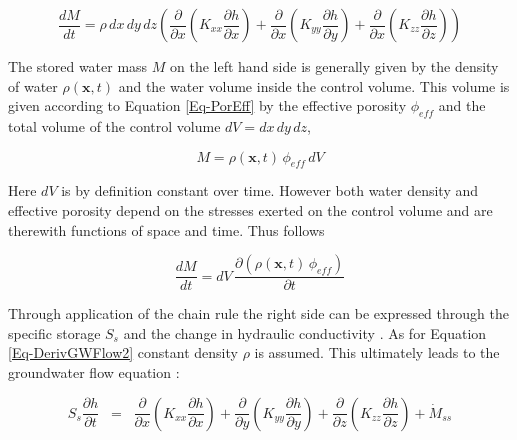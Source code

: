 \begin{equation}
    \label{Eq-DerivGWFlow4}
    \frac{dM}{dt} = \rho \, dx \, dy \, dz \left( \frac{\partial}{\partial x} \left( K_{xx} \frac{\partial h}{\partial x} \right) + \frac{\partial}{\partial x} \left( K_{yy} \frac{\partial h}{\partial y} \right) + \frac{\partial}{\partial x} \left( K_{zz} \frac{\partial h}{\partial z} \right) \right)
\end{equation}

The stored water mass $M$ on the left hand side is generally given by the density of water $\rho(\bm{x},t)$ and the water volume inside the control volume. 
This volume is given according to Equation \eqref{Eq-PorEff} by the effective porosity $\phi_{eff}$ and the total volume of the control volume $dV = dx \, dy \, dz$,

\begin{equation}
    \label{Eq-DerivGWFlow5}
    M = \rho(\bm{x},t) \, \phi_{eff} \, dV
\end{equation}

\noindent Here $dV$ is by definition constant over time. However both water density and effective porosity depend on the stresses exerted on the control volume and are therewith functions of space and time. 
Thus follows

\begin{equation}
    \label{Eq-DerivGWFlow6}
    \frac{dM}{dt} = dV \, \frac{\partial (\rho(\bm{x},t) \, \phi_{eff})}{\partial t}
\end{equation}

\noindent Through application of the chain rule the right side can be expressed through the specific storage $S_s$ and the change in hydraulic conductivity \parencite{Mays.2005}. 
As for Equation \eqref{Eq-DerivGWFlow2} constant density $\rho$ is assumed. This ultimately leads to the groundwater flow equation \parencite{Mays.2005}:

\begin{equation}
    \label{Eq-GWFlow}
    S_s \frac{\partial h}{\partial t} \; \; = \; \; \frac{\partial}{\partial x} \left(K_{xx} \frac{\partial h}{\partial x} \right) + \frac{\partial}{\partial y} \left(K_{yy} \frac{\partial h}{\partial y} \right) + \frac{\partial}{\partial z} \left(K_{zz} \frac{\partial h}{\partial z} \right) + \dot{M}_{ss}
\end{equation}